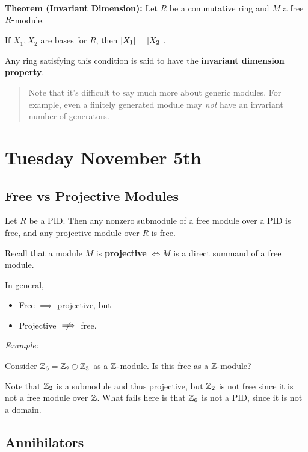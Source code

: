 \textbf{Theorem (Invariant Dimension):} Let \(R\) be a commutative ring
and \(M\) a free \(R{\hbox{-}}\)module.

If \(X_1, X_2\) are bases for \(R\), then \({\left\lvert {X_1} \right\rvert} = {\left\lvert {X_2} \right\rvert}\).

Any ring satisfying this condition is said to have the \textbf{invariant
dimension property}.

\begin{quote}
Note that it's difficult to say much more about generic modules. For
example, even a finitely generated module may \emph{not} have an
invariant number of generators.
\end{quote}

\hypertarget{tuesday-november-5th}{%
\section{Tuesday November 5th}\label{tuesday-november-5th}}

\hypertarget{free-vs-projective-modules}{%
\subsection{Free vs Projective
Modules}\label{free-vs-projective-modules}}

Let \(R\) be a PID. Then any nonzero submodule of a free module over a
PID is free, and any projective module over \(R\) is free.

Recall that a module \(M\) is \textbf{projective} \(\iff M\) is a direct
summand of a free module.

In general,

\begin{itemize}
\item
  Free \(\implies\) projective, but
\item
  Projective \(\centernot\implies\) free.
\end{itemize}

\emph{Example:}

Consider \({\mathbb{Z}}_6 = {\mathbb{Z}}_2 \oplus {\mathbb{Z}}_3\) as a \({\mathbb{Z}}{\hbox{-}}\)module. Is this
free as a \({\mathbb{Z}}{\hbox{-}}\)module?

Note that \({\mathbb{Z}}_2\) is a submodule and thus projective, but \({\mathbb{Z}}_2\) is
not free since it is not a free module over \({\mathbb{Z}}\). What fails here is
that \({\mathbb{Z}}_6\) is not a PID, since it is not a domain.

\hypertarget{annihilators}{%
\subsection{Annihilators}\label{annihilators}}

